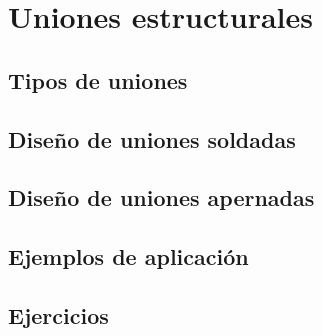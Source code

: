 %
%

\chapter{Uniones estructurales}
\section{Tipos de uniones}
\section{Diseño de uniones soldadas}
\section{Diseño de uniones apernadas}
\section{Ejemplos de aplicación}
\section{Ejercicios}